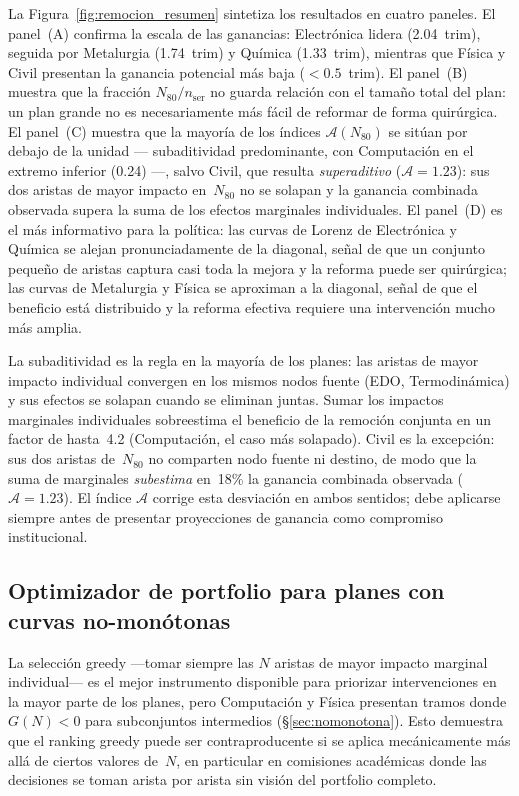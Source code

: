 \documentclass[11pt,letterpaper]{article}
\begin{document}
La Figura~\ref{fig:remocion_resumen} sintetiza los resultados en cuatro
paneles.
El panel~(A) confirma la escala de las ganancias: Electrónica lidera
(2.04~trim), seguida por Metalurgia (1.74~trim) y Química (1.33~trim), mientras
que Física y Civil presentan la ganancia potencial más baja
($< 0.5$~trim).
El panel~(B) muestra que la fracción $N_{80}/n_{\mathrm{ser}}$ no guarda
relación con el tamaño total del plan: un plan grande no es necesariamente más
fácil de reformar de forma quirúrgica.
El panel~(C) muestra que la mayoría de los índices $\mathcal{A}(N_{80})$ se
sitúan por debajo de la unidad --- subaditividad predominante, con Computación
en el extremo inferior (0.24) ---, salvo Civil, que resulta \emph{superaditivo}
($\mathcal{A}=1.23$): sus dos aristas de mayor impacto en~$N_{80}$ no se
solapan y la ganancia combinada observada supera la suma de los efectos
marginales individuales.
El panel~(D) es el más informativo para la política: las curvas de Lorenz de
Electrónica y Química se alejan pronunciadamente de la diagonal, señal de que
un conjunto pequeño de aristas captura casi toda la mejora y la reforma puede
ser quirúrgica; las curvas de Metalurgia y Física se aproximan a la diagonal,
señal de que el beneficio está distribuido y la reforma efectiva requiere una
intervención mucho más amplia.

\begin{notabox}
La subaditividad es la regla en la mayoría de los planes: las aristas de mayor
impacto individual convergen en los mismos nodos fuente (EDO, Termodinámica)
y sus efectos se solapan cuando se eliminan juntas.
Sumar los impactos marginales individuales sobreestima el beneficio de la
remoción conjunta en un factor de hasta~4.2 (Computación, el caso más
solapado).
Civil es la excepción: sus dos aristas de~$N_{80}$ no comparten nodo fuente
ni destino, de modo que la suma de marginales \emph{subestima} en~18\% la
ganancia combinada observada ($\mathcal{A}=1.23$).
El índice $\mathcal{A}$ corrige esta desviación en ambos sentidos; debe
aplicarse siempre antes de presentar proyecciones de ganancia como compromiso
institucional.
\end{notabox}

\subsection{Optimizador de portfolio para planes con curvas no-monótonas}
\label{sec:optimizador_portfolio}

La selección greedy ---tomar siempre las $N$ aristas de mayor impacto marginal
individual--- es el mejor instrumento disponible para priorizar intervenciones
en la mayor parte de los planes, pero Computación y Física presentan tramos
donde $G(N) < 0$ para subconjuntos intermedios
(\S\ref{sec:nomonotona}).
Esto demuestra que el ranking greedy puede ser contraproducente si se aplica
mecánicamente más allá de ciertos valores de~$N$, en particular en comisiones
académicas donde las decisiones se toman arista por arista sin visión del
portfolio completo.
\end{document}
